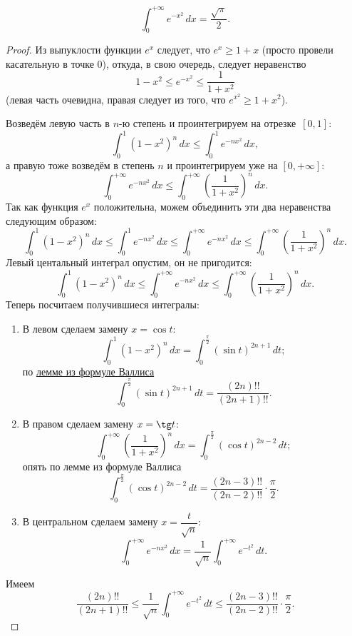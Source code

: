 \hypertarget{puas}{}
\begin{theorem}
	\[
	\int_0^{+\infty} e^{-x^2} \, dx = \frac{\sqrt{\pi}}{2}.
	\]
\end{theorem}

\begin{proof}
	Из выпуклости функции \(e^x\) следует, что \(e^x \geqslant 1 + x\) (просто провели касательную в точке \(0\)), откуда, в свою очередь, следует неравенство \[
	1 - x^2 \leqslant e^{-x^2} \leqslant \frac{1}{1 + x^2}
	\]
	(левая часть очевидна, правая следует из того, что \(e^{x^2} \geqslant 1 + x^2\)).
	
	Возведём левую часть в \(n\)-ю степень и проинтегрируем на отрезке~\([0, 1]\): \[
	\int_0^1 (1 - x^2)^n \, dx \leqslant \int_0^1 e^{-nx^2} \, dx,
	\]
	а правую тоже возведём в степень \(n\) и проинтегрируем уже на \([0, +\infty]\): \[
	\int_0^{+\infty} e^{-nx^2} \, dx \leqslant \int_0^{+\infty} \left(\frac{1}{1 + x^2} \right)^n \, dx.
	\]
	Так как функция \(e^x\) положительна, можем объединить эти два неравенства следующим образом: \[
	\int_0^1 (1 - x^2)^n \, dx \leqslant \int_0^1 e^{-nx^2} \, dx \leqslant \int_0^{+\infty} e^{-nx^2} \, dx \leqslant \int_0^{+\infty} \left(\frac{1}{1 + x^2} \right)^n \, dx.
	\]
	Левый центальный интеграл опустим, он не пригодится: \[
	\int_0^1 (1 - x^2)^n \, dx \leqslant \int_0^{+\infty} e^{-nx^2} \, dx \leqslant \int_0^{+\infty} \left(\frac{1}{1 + x^2} \right)^n \, dx.
	\]
	Теперь посчитаем получившиеся интегралы:
	\begin{enumerate}
		\item В левом сделаем замену \(x = \cos t\): \[
		\int_0^1 (1 - x^2)^n \, dx = \int_0^{\frac{\pi}{2}} (\sin t)^{2n + 1} \, dt;
		\]
		по \hyperlink{vallem}{лемме из формуле Валлиса} \[
		\int_0^{\frac{\pi}{2}} (\sin t)^{2n + 1} \, dt = \frac{(2n)!!}{(2n + 1)!!}.
		\]
		\item В правом сделаем замену \(x = \tg t\): \[
		\int_0^{+\infty} \left(\frac{1}{1 + x^2} \right)^n \, dx = \int_{0}^{\frac{\pi}{2}} (\cos t)^{2n - 2} \, dt;
		\]
		опять по лемме из формуле Валлиса \[
		\int_{0}^{\frac{\pi}{2}} (\cos t)^{2n - 2} \, dt  = \frac{(2n - 3)!!}{(2n - 2)!!} \cdot \frac{\pi}{2}.
		\]
		\item В центральном сделаем замену \(x = \dfrac{t}{\sqrt{n}}\): \[
		\int_0^{+\infty} e^{-nx^2} \, dx = \frac{1}{\sqrt{n}} \int_0^{+\infty} e^{-t^2} \, dt.
		\]
	\end{enumerate}
	Имеем \[
	\frac{(2n)!!}{(2n + 1)!!} \leqslant \frac{1}{\sqrt{n}} \int_0^{+\infty} e^{-t^2} \, dt \leqslant \frac{(2n - 3)!!}{(2n - 2)!!} \cdot \frac{\pi}{2}.
\]
\end{proof}
